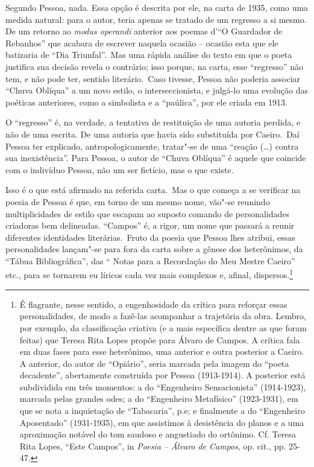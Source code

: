 Segundo Pessoa, nada. Essa opção é descrita por ele, na carta de 1935,
como uma medida natural: para o autor, teria apenas se tratado de um
regresso a si mesmo. De um retorno ao \emph{modus operandi} anterior aos
poemas d'``O Guardador de Rebanhos'' que acabara de escrever naquela
ocasião -- ocasião esta que ele batizaria de ``Dia Triunfal''.~Mas uma
rápida análise do texto em que o poeta justifica sua decisão revela o
contrário; isso porque, na carta, esse ``regresso'' não tem, e não pode
ter, sentido literário.~Caso tivesse, Pessoa não poderia associar
``Chuva Oblíqua'' a um novo estilo, o interseccionista, e julgá-lo uma
evolução das poéticas anteriores, como a simbolista e a ``paúlica'', por
ele criada em 1913.

O ``regresso'' é, na verdade, a tentativa de restituição de uma autoria
perdida, e não de uma escrita. De uma autoria que havia sido substituída
por Caeiro.~Daí Pessoa ter explicado, antropologicamente, tratar"-se de
uma ``reação (\ldots{}) contra sua inexistência''. Para Pessoa, o autor de
``Chuva Oblíqua'' é aquele que coincide com o indivíduo Pessoa, não um
ser fictício, mas o que existe.

Isso é o que está afirmado na referida carta.~Mas o que começa a se
verificar na poesia de Pessoa é que, em torno de um mesmo nome, vão"-se
reunindo multiplicidades de estilo que escapam ao suposto comando de
personalidades criadoras bem delineadas. ``Campos'' é, a rigor, um nome
que passará a reunir diferentes identidades literárias.~Fruto da poesia
que Pessoa lhes atribui, essas personalidades lançam"-se para fora da
carta sobre a gênese dos heterônimos, da ``Tábua Bibliográfica'', das ``
Notas para a Recordação do Meu Mestre Caeiro'' etc., para se tornarem eu
líricos cada vez mais complexos e, afinal, dispersos.\footnote{É
  flagrante, nesse sentido, a engenhosidade da crítica para reforçar
  essas personalidades, de modo a fazê-las acompanhar a trajetória da
  obra. Lembro, por exemplo, da classificação criativa (e a mais
  específica dentre as que foram feitas) que Teresa Rita Lopes propõe
  para Álvaro de Campos. A crítica fala em duas fases para esse
  heterônimo, uma anterior e outra posterior a Caeiro. A anterior, do
  autor de ``Opiário'', seria marcada pela imagem do ``poeta
  decadente'', abertamente construída por Pessoa (1913-1914). A
  posterior está subdividida em três momentos: a do ``Engenheiro
  Sensacionista'' (1914-1923), marcada pelas grandes odes; a do
  ``Engenheiro Metafísico'' (1923-1931), em que se nota a inquietação de
  ``Tabacaria'', p.e; e finalmente a do ``Engenheiro Aposentado''
  (1931-1935), em que assistimos à desistência do planos e a uma
  aproximação notável do tom saudoso e angustiado do ortônimo. Cf.
  Teresa Rita Lopes, ``Este Campos'', in \emph{Poesia -- Álvaro de
  Campos}, op. cit., pp. 25-47.}

